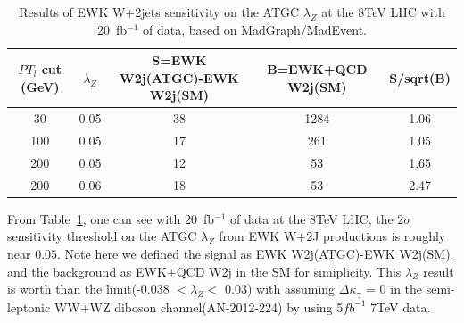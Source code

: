 \begin{center}
\begin{table}[h!]
\begin{tabular}{c|c|c|c|c}
\hline
$PT_l$ cut (GeV) & $\lambda_Z$ & S=EWK W2j(ATGC)-EWK W2j(SM) 
& B=EWK+QCD W2j(SM) & S/sqrt(B)  \\ \hline 
30     & 0.05  &  38      &     1284      &     1.06    \\\hline 
100    & 0.05  &  17      &     261       &     1.05    \\\hline 
200    & 0.05  &  12      &     53      &     1.65    \\\hline 
200    & 0.06  &  18      &     53      &     2.47    \\\hline 
\end{tabular}
\caption{\label{tabtgc} Results of EWK W+2jets sensitivity on the ATGC $\lambda_Z$ at the 8TeV LHC with 20~fb${}^{-1}$ of data, based on MadGraph/MadEvent.}
\end{table}
\end{center}

From Table~\ref{tabtgc}, one can see with 20~fb${}^{-1}$ of data at the 8TeV LHC, the $2\sigma$ sensitivity threshold on the ATGC $\lambda_Z$ from EWK W+2J productions is roughly near $0.05$. Note here we defined the signal as EWK W2j(ATGC)-EWK W2j(SM), and the background as EWK+QCD W2j in the SM for simiplicity. This $\lambda_Z$ result is worth than the limit(-0.038 $< \lambda_{Z} <$ 0.03) with assuming $\Delta\kappa_{\gamma}$ = 0 in the semi-leptonic WW+WZ diboson channel(AN-2012-224) by using 5$fb^{-1}$ 7TeV data. 
